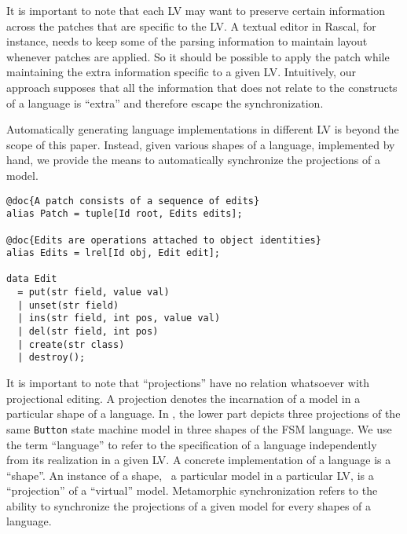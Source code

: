 It is important to note that each LV may want to preserve certain information across the patches that are specific to the LV.
A textual editor in Rascal, for instance, needs to keep some of the parsing information to maintain layout whenever patches are applied.
So it should be possible to apply the patch while maintaining the extra information specific to a given LV.
Intuitively, our approach supposes that all the information that does not relate to the constructs of a language is ``extra'' and therefore escape the synchronization. 

Automatically generating language implementations in different LV is beyond the scope of this paper.
Instead, given various shapes of a language, implemented by hand, we provide the means to automatically synchronize the projections of a model.


\begin{lstlisting}[label=lst:delta-adt, caption={CRUD-like patch definition in Rascal}, language=Rascal, float=tb]
@doc{A patch consists of a sequence of edits}
alias Patch = tuple[Id root, Edits edits];

@doc{Edits are operations attached to object identities}
alias Edits = lrel[Id obj, Edit edit];

data Edit
  = put(str field, value val)
  | unset(str field)
  | ins(str field, int pos, value val)
  | del(str field, int pos)
  | create(str class) 
  | destroy();
\end{lstlisting}

It is important to note that ``projections'' have no relation whatsoever with projectional editing.
A projection denotes the incarnation of a model in a particular shape of a language.
In , the lower part depicts three projections of the same \texttt{Button} state machine model in three shapes of the FSM language.
We use the term ``language'' to refer to the specification of a language independently from its realization in a given LV.
A concrete implementation of a language is a ``shape''.
An instance of a shape, \ie~a particular model in a particular LV, is a ``projection'' of a ``virtual'' model.
Metamorphic synchronization refers to the ability to synchronize the projections of a given model for every shapes of a language.
